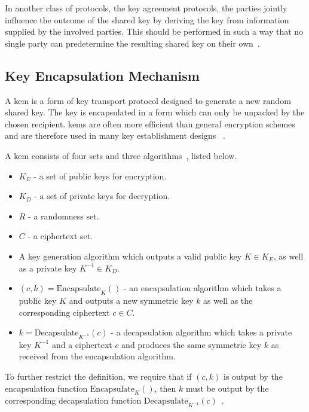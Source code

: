 In another class of protocols, the key agreement protocols, the parties jointly influence the outcome of the shared key by deriving the key from information supplied by the involved parties. This should be performed in such a way that no single party can predetermine the resulting shared key on their own~\cite{boyd2020}.

\subsection{Key Encapsulation Mechanism}

A \acrfull{kem} is a form of key transport protocol designed to generate a new random shared key. The key is encapsulated in a form which can only be unpacked by the chosen recipient. \glspl{kem} are often more efficient than general encryption schemes and are therefore used in many key establishment designs ~\cite{boyd2020}.

A \gls{kem} consists of four sets and three algorithms~\cite{boyd2020}, listed below.

\begin{itemize}
    \item $K_E$ - a set of public keys for encryption.
    \item $K_D$ - a set of private keys for decryption.
    \item $R$ - a randomness set.
    \item $C$ - a ciphertext set.
\end{itemize}

\begin{itemize}
    \item A key generation algorithm which outputs a valid public key $K\in K_E$, as well as a private key $K^{-1}\in K_D$.
    \item $(c,k)=\text{Encapsulate}_K()$ - an encapsulation algorithm which takes a public key $K$ and outputs a new symmetric key $k$ as well as the corresponding ciphertext $c\in C$.
    \item $k=\text{Decapsulate}_{K^{-1}}(c)$ - a decapsulation algorithm which takes a private key $K^{-1}$ and a ciphertext $c$ and produces the same symmetric key $k$ as received from the encapsulation algorithm.
\end{itemize}

To further restrict the definition, we require that if $(c,k)$ is output by the encapsulation function $\text{Encapsulate}_K()$, then $k$ must be output by the corresponding decapsulation function $\text{Decapsulate}_{K^{-1}}(c)$~\cite{boyd2020}.

